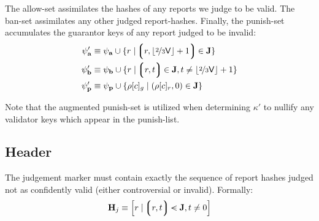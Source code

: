 The allow-set assimilates the hashes of any reports we judge to be valid. The ban-set assimilates any other judged report-hashes. Finally, the punish-set accumulates the guarantor keys of any report judged to be invalid:
\begin{align}
  \psi'_\mathbf{a} &\equiv \psi_\mathbf{a} \cup \{r \mid \tup{r, \floor{\nicefrac{2}{3}\mathsf{V}} + 1} \in \mathbf{J} \} \\
  \psi'_\mathbf{b} &\equiv \psi_\mathbf{b} \cup \{r \mid \tup{r, t} \in \mathbf{J}, t \ne \floor{\nicefrac{2}{3}\mathsf{V}} + 1 \} \\
  \psi'_\mathbf{p} &\equiv \psi_\mathbf{p} \cup \{ \rho[c]_g \mid (\rho[c]_r, 0) \in \mathbf{J} \}
\end{align}

Note that the augmented punish-set is utilized when determining $\kappa'$ to nullify any validator keys which appear in the punish-list.

\subsection{Header}\label{sec:judgementmarker}

The judgement marker must contain exactly the sequence of report hashes judged not as confidently valid (\ie either controversial or invalid). Formally:
\begin{equation}
  \mathbf{H}_j \equiv \sq{r \mid \tup{r, t} \orderedin \mathbf{J}, t \ne 0}
\end{equation}
